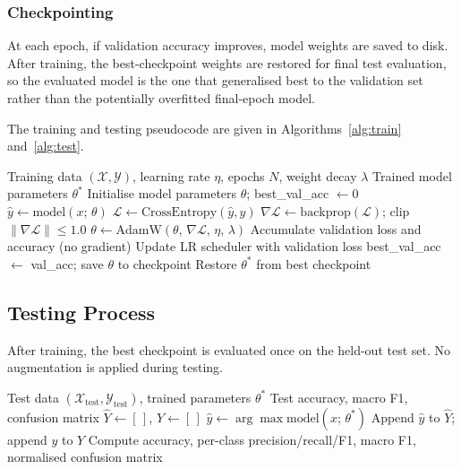 \documentclass[12pt, letterpaper]{article}
\begin{document}
\subsubsection{Checkpointing}

At each epoch, if validation accuracy improves, model weights are saved to disk.
After training, the best-checkpoint weights are restored for final test evaluation,
so the evaluated model is the one that generalised best to the validation set
rather than the potentially overfitted final-epoch model.

The training and testing pseudocode are given in Algorithms~\ref{alg:train}
and~\ref{alg:test}.

\begin{algorithm}[h!]
\caption{General Training Procedure}
\label{alg:train}
\begin{algorithmic}[1]
\Require Training data $(\mathcal{X}, \mathcal{Y})$, learning rate $\eta$,
         epochs $N$, weight decay $\lambda$
\Ensure Trained model parameters $\theta^*$
\State Initialise model parameters $\theta$; best\_val\_acc $\leftarrow 0$
        \State $\hat{y} \leftarrow \text{model}(x;\, \theta)$
        \State $\mathcal{L} \leftarrow \text{CrossEntropy}(\hat{y}, y)$
        \State $\nabla\mathcal{L} \leftarrow \text{backprop}(\mathcal{L})$;
               clip $\|\nabla\mathcal{L}\| \leq 1.0$
        \State $\theta \leftarrow \text{AdamW}(\theta,\, \nabla\mathcal{L},\,
               \eta,\, \lambda)$
    \EndFor
        \State Accumulate validation loss and accuracy (no gradient)
    \EndFor
    \State Update LR scheduler with validation loss
        \State best\_val\_acc $\leftarrow$ val\_acc; save $\theta$ to checkpoint
    \EndIf
\EndFor
\State Restore $\theta^*$ from best checkpoint
\end{algorithmic}
\end{algorithm}

\subsection{Testing Process}

After training, the best checkpoint is evaluated once on the held-out test set.
No augmentation is applied during testing.

\begin{algorithm}[h!]
\caption{Testing Procedure}
\label{alg:test}
\begin{algorithmic}[1]
\Require Test data $(\mathcal{X}_{\text{test}}, \mathcal{Y}_{\text{test}})$,
         trained parameters $\theta^*$
\Ensure Test accuracy, macro F1, confusion matrix
\State $\hat{Y} \leftarrow [\,]$, $Y \leftarrow [\,]$
    \State $\hat{y} \leftarrow \arg\max \text{model}(x;\, \theta^*)$
    \State Append $\hat{y}$ to $\hat{Y}$; append $y$ to $Y$
\EndFor
\State Compute accuracy, per-class precision/recall/F1, macro F1,
       normalised confusion matrix
\end{algorithmic}
\end{algorithm}
\end{document}
